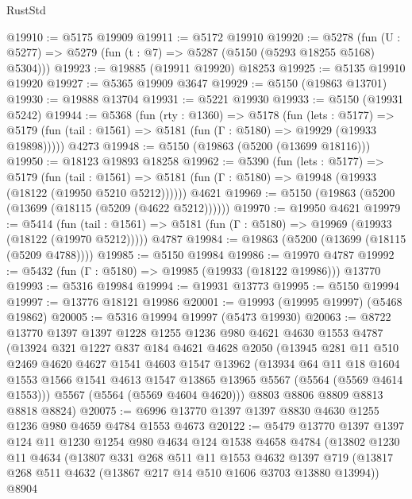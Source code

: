 \begin{lexlean}{RustStd}
\begin{coremodule}
@19910 := @5175 @19909
@19911 := @5172 @19910
@19920 := @5278
    (fun (U : @5277) => @5279 (fun (t : @7) => @5287 (@5150 (@5293 @18255 @5168) @5304)))
@19923 := @19885 (@19911 @19920) @18253
@19925 := @5135 @19910 @19920
@19927 := @5365 @19909 @3647
@19929 := @5150 (@19863 @13701)
@19930 := @19888 @13704
@19931 := @5221 @19930
@19933 := @5150 (@19931 @5242)
@19944 := @5368
    (fun (rty : @1360) =>
    @5178
      (fun (lets : @5177) =>
      @5179 (fun (tail : @1561) => @5181 (fun (Γ : @5180) => @19929 (@19933 @19898)))))
    @4273
@19948 := @5150 (@19863 (@5200 (@13699 @18116)))
@19950 := @18123 @19893 @18258
@19962 := @5390
    (fun (lets : @5177) =>
    @5179
      (fun (tail : @1561) =>
      @5181 (fun (Γ : @5180) => @19948 (@19933 (@18122 (@19950 @5210 @5212))))))
    @4621
@19969 := @5150 (@19863 (@5200 (@13699 (@18115 (@5209 (@4622 @5212))))))
@19970 := @19950 @4621
@19979 := @5414
    (fun (tail : @1561) => @5181 (fun (Γ : @5180) => @19969 (@19933 (@18122 (@19970 @5212)))))
    @4787
@19984 := @19863 (@5200 (@13699 (@18115 (@5209 @4788))))
@19985 := @5150 @19984
@19986 := @19970 @4787
@19992 := @5432 (fun (Γ : @5180) => @19985 (@19933 (@18122 @19986))) @13770
@19993 := @5316 @19984
@19994 := @19931 @13773
@19995 := @5150 @19994
@19997 := @13776 @18121 @19986
@20001 := @19993 (@19995 @19997) (@5468 @19862)
@20005 := @5316 @19994 @19997 (@5473 @19930)
@20063 := @8722
    @13770
    @1397
    @1397
    @1228
    @1255
    @1236
    @980
    @4621
    @4630
    @1553
    @4787
    (@13924
      @321
      @1227
      @837
      @184
      @4621
      @4628
      @2050
      (@13945
        @281
        @11
        @510
        @2469
        @4620
        @4627
        @1541
        @4603
        @1547
        @13962
        (@13934
          @64
          @11
          @18
          @1604
          @1553
          @1566
          @1541
          @4613
          @1547
          @13865
          @13965
          @5567
          (@5564 (@5569 @4614 @1553)))
        @5567
        (@5564 (@5569 @4604 @4620)))
      @8803
      @8806
      @8809
      @8813
      @8818
      @8824)
@20075 := @6996 @13770 @1397 @1397 @8830 @4630 @1255 @1236 @980 @4659 @4784 @1553 @4673
@20122 := @5479
    @13770
    @1397
    @1397
    @124
    @11
    @1230
    @1254
    @980
    @4634
    @124
    @1538
    @4658
    @4784
    (@13802
      @1230
      @11
      @4634
      (@13807
        @331
        @268
        @511
        @11
        @1553
        @4632
        @1397
        @719
        (@13817 @268 @511 @4632 (@13867 @217 @14 @510 @1606 @3703 @13880 @13994))
        @8904

\end{coremodule}
\end{lexlean}
